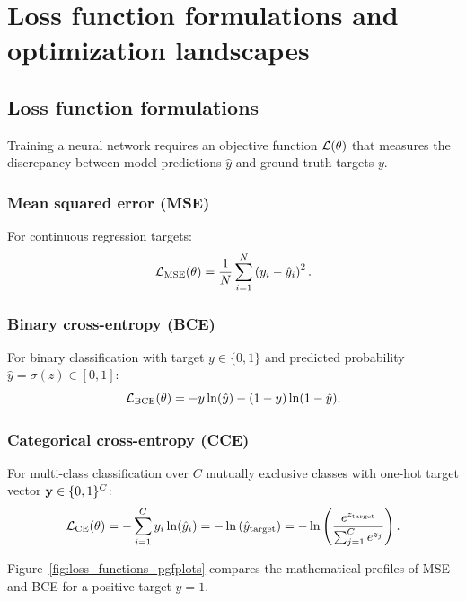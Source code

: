 \documentclass[../../main.tex]{subfiles}
\begin{document}
\clearpage
\section{Loss function formulations and optimization landscapes}
\label{sec:output_loss_opt}

\subsection{Loss function formulations}
Training a neural network requires an objective function $\mathcal{L}(\theta)$ that measures the discrepancy between model predictions $\hat{y}$ and ground-truth targets $y$.

\subsubsection{Mean squared error (MSE)}
For continuous regression targets:
\begin{equation}
\label{eq:mse_loss}
\mathcal{L}_{\text{MSE}}(\theta) = \frac{1}{N} \sum_{i=1}^N \left( y_i - \hat{y}_i \right)^2.
\end{equation}

\subsubsection{Binary cross-entropy (BCE)}
For binary classification with target $y \in \{0, 1\}$ and predicted probability $\hat{y} = \sigma(z) \in [0, 1]$:
\begin{equation}
\label{eq:bce_loss}
\mathcal{L}_{\text{BCE}}(\theta) = - y \ln(\hat{y}) - (1 - y) \ln(1 - \hat{y}).
\end{equation}

\subsubsection{Categorical cross-entropy (CCE)}
For multi-class classification over $C$ mutually exclusive classes with one-hot target vector $\mathbf{y} \in \{0, 1\}^C$:
\begin{equation}
\label{eq:cce_loss}
\mathcal{L}_{\text{CE}}(\theta) = - \sum_{i=1}^C y_i \ln(\hat{y}_i) = - \ln\left( \hat{y}_{\text{target}} \right) = - \ln\left( \frac{e^{z_{\text{target}}}}{\sum_{j=1}^C e^{z_j}} \right).
\end{equation}

Figure~\ref{fig:loss_functions_pgfplots} compares the mathematical profiles of MSE and BCE for a positive target $y = 1$.
\end{document}
